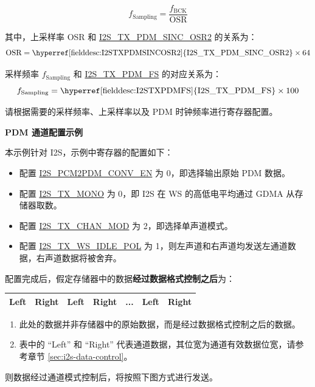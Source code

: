 \documentclass[main\_\_CN.tex]{subfiles}
\begin{document}
\begin{itemize}
    $$f_{\textrm{Sampling}} = \frac{f_{\textrm{BCK}}}{\textrm{OSR}}$$
    
    其中，上采样率 OSR 和 \hyperref[fielddesc:I2STXPDMSINCOSR2]{I2S\_TX\_PDM\_SINC\_OSR2} 的关系为：
    $${\textrm{OSR}} = {\textrm{\hyperref[fielddesc:I2STXPDMSINCOSR2]{I2S\_TX\_PDM\_SINC\_OSR2}}} \times {\textrm{64}}$$
    
    采样频率 $f_{\textrm{Sampling}}$ 和 \hyperref[fielddesc:I2STXPDMFS]{I2S\_TX\_PDM\_FS} 的对应关系为：
    $$f_{\textrm{Sampling}} = {\textrm{\hyperref[fielddesc:I2STXPDMFS]{I2S\_TX\_PDM\_FS}}} \times {\textrm{100}}$$
    
    请根据需要的采样频率、上采样率以及 PDM 时钟频率进行寄存器配置。
\end{itemize}


\textbf{PDM 通道配置示例}

本示例针对 I2S，示例中寄存器的配置如下：

\begin{itemize}
    \item 配置 \hyperref[fielddesc:I2SPCM2PDMCONVEN]{I2S\_PCM2PDM\_CONV\_EN} 为 0，即选择输出原始 PDM 数据。
    \item 配置 \hyperref[fielddesc:I2STXMONO]{I2S\_TX\_MONO} 为 0，即 I2S 在 WS 的高低电平均通过 GDMA 从存储器取数。
    \item 配置 \hyperref[fielddesc:I2STXCHANMOD]{I2S\_TX\_CHAN\_MOD} 为 2，即选择单声道模式。
    \item 配置 \hyperref[fielddesc:I2STXWSIDLEPOL]{I2S\_TX\_WS\_IDLE\_POL} 为 1，则左声道和右声道均发送左通道数据，右声道数据将被舍弃。
\end{itemize}

配置完成后，假定存储器中的数据\textbf{经过数据格式控制之后}为：

\begin{table}[H]
    \centering
    \begin{tabular}{|c|c|c|c|c|c|c|}
    \hline
    Left & Right & Left & Right & ... & Left & Right \\ \hline
    \end{tabular}
\end{table}
\vspace{-0.5em}
\begin{tiplisting}
\vspace{-2em}
\begin{enumerate}
    \item 此处的数据并非存储器中的原始数据，而是经过数据格式控制之后的数据。
    \item 表中的 ``Left” 和 ``Right” 代表通道数据，其位宽为通道有效数据位宽，请参考章节 \ref{sec:i2s-data-control}。
\end{enumerate}
\end{tiplisting}
\vspace{-1em}
则数据经过通道模式控制后，将按照下图方式进行发送。
\end{document}
